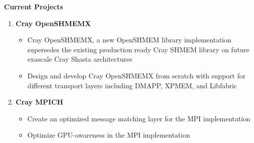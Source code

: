 \textbf{Current Projects}
\begin{enumerate}
\setcounter{enumi}{0}
\item \textbf{Cray OpenSHMEMX}
    \begin{itemize}
        \item Cray OpenSHMEMX, a new OpenSHMEM library implementation supersedes
        the existing production ready Cray SHMEM library on future exascale Cray
        Shasta architectures
        \item Design and develop Cray OpenSHMEMX from scratch with support for
        different transport layers including DMAPP, XPMEM, and Libfabric
    \end{itemize}

\item \textbf{Cray MPICH}
    \begin{itemize}
        \item Create an optimized message matching layer for the MPI
        implementation
        \item Optimize GPU-awareness in the MPI implementation
    \end{itemize}
\end{enumerate}

